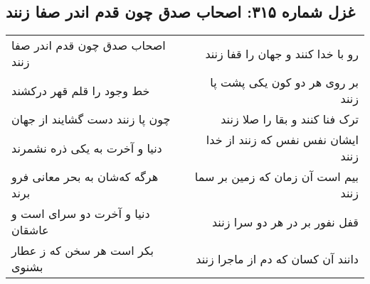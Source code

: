 \begin{center}
\section*{غزل شماره ۳۱۵: اصحاب صدق چون قدم اندر صفا زنند}
\label{sec:315}
\begin{longtable}{l p{0.5cm} r}
اصحاب صدق چون قدم اندر صفا زنند
&&
رو با خدا کنند و جهان را قفا زنند
\\
خط وجود را قلم قهر درکشند
&&
بر روی هر دو کون یکی پشت پا زنند
\\
چون پا زنند دست گشایند از جهان
&&
ترک فنا کنند و بقا را صلا زنند
\\
دنیا و آخرت به یکی ذره نشمرند
&&
ایشان نفس نفس که زنند از خدا زنند
\\
هرگه که‌شان به بحر معانی فرو برند
&&
بیم است آن زمان که زمین بر سما زنند
\\
دنیا و آخرت دو سرای است و عاشقان
&&
قفل نفور بر در هر دو سرا زنند
\\
بکر است هر سخن که ز عطار بشنوی
&&
دانند آن کسان که دم از ماجرا زنند
\\
\end{longtable}
\end{center}
